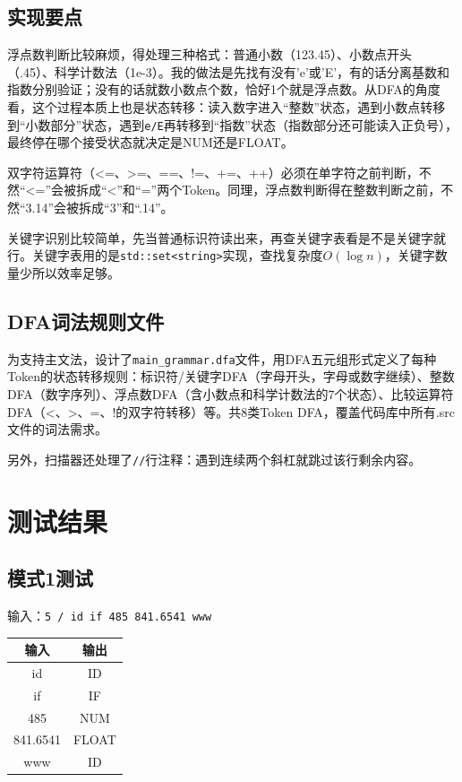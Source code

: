 \documentclass[12pt,a4paper]{ctexart}
\begin{document}
\subsection{实现要点}
浮点数判断比较麻烦，得处理三种格式：普通小数（123.45）、小数点开头（.45）、科学计数法（1e-3）。我的做法是先找有没有'e'或'E'，有的话分离基数和指数分别验证；没有的话就数小数点个数，恰好1个就是浮点数。从DFA的角度看，这个过程本质上也是状态转移：读入数字进入“整数”状态，遇到小数点转移到“小数部分”状态，遇到\texttt{e/E}再转移到“指数”状态（指数部分还可能读入正负号），最终停在哪个接受状态就决定是NUM还是FLOAT。

双字符运算符（<=、>=、==、!=、+=、++）必须在单字符之前判断，不然``<=''会被拆成``<''和``=''两个Token。同理，浮点数判断得在整数判断之前，不然``3.14''会被拆成``3''和``.14''。

关键字识别比较简单，先当普通标识符读出来，再查关键字表看是不是关键字就行。关键字表用的是\texttt{std::set<string>}实现，查找复杂度$O(\log n)$，关键字数量少所以效率足够。

\subsection{DFA词法规则文件}
为支持主文法，设计了\texttt{main\_grammar.dfa}文件，用DFA五元组形式定义了每种Token的状态转移规则：标识符/关键字DFA（字母开头，字母或数字继续）、整数DFA（数字序列）、浮点数DFA（含小数点和科学计数法的7个状态）、比较运算符DFA（<、>、=、!的双字符转移）等。共8类Token DFA，覆盖代码库中所有.src文件的词法需求。

另外，扫描器还处理了\texttt{//}行注释：遇到连续两个斜杠就跳过该行剩余内容。

\section{测试结果}

\subsection{模式1测试}
输入：\texttt{5 / id if 485 841.6541 www}

\begin{table}[h]
\centering
\begin{tabular}{cc}
\toprule
输入 & 输出 \\
\midrule
id & ID \\
if & IF \\
485 & NUM \\
841.6541 & FLOAT \\
www & ID \\
\bottomrule
\end{tabular}
\end{table}
\end{document}
